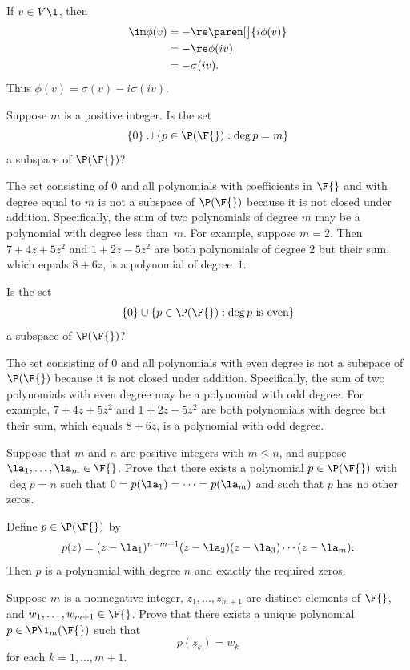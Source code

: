 \begin{Solution}
If $v \in V\1$, then
\begin{align*}
\im \phi(v) &= - \re \paren[\big]{i\phi(v)}\\
&= - \re \phi(iv) \\
&= - \sigma(iv).
\end{align*}
Thus $\phi(v) = \sigma(v) - i \sigma(iv)$.
\end{Solution}

\exercise
Suppose $m$ is a positive integer.  Is the set
\[
\{0\} \cup \{p \in \P(\F{}): \deg p = m\}
\]
a subspace of $\P(\F{})$?

\begin{Solution}
The set consisting of $0$ and all
polynomials with coefficients in $\F{}$ and with degree equal to $m$ is not a
subspace of $\P(\F{})$ because it is not closed under addition.  Specifically,
the sum of two polynomials of degree $m$ may be a polynomial with degree less
than~$m$.  For example, suppose $m = 2$.  Then $7 + 4z + 5z^2$ and
$1 + 2z - 5z^2$ are both polynomials of degree $2$ but their sum, which equals
$8 + 6z$, is a polynomial of degree~$1$.
\end{Solution}

\exercise
Is the set
\[
\{0\} \cup \{p \in \P(\F{}): \deg p \text{ is even}\}
\]
a subspace of $\P(\F{})$?

\begin{Solution}
The set consisting of $0$ and all polynomials with even degree is not a subspace of $\P(\F{})$ because it is not closed under addition.  Specifically, the sum of two polynomials with even degree may be a polynomial with odd degree.  For example, $7 + 4z + 5z^2$ and
$1 + 2z - 5z^2$ are both polynomials with degree but their sum, which equals $8 + 6z$, is a polynomial with odd degree.
\end{Solution}

\exercise
Suppose that $m$ and $n$ are positive integers with $m \le n$, and suppose $\la_1, \dots, \la_m \in \F{}$. Prove that there exists a polynomial $p \in \P(\F{})$ with $\deg p = n$ such that $0 = p(\la_1) = \dots = p(\la_m)$ and such that $p$ has no other zeros.

\begin{Solution}
Define $p \in \P(\F{})$ by
\[
p(z) = (z-\la_1)^{n-m+1} (z-\la_2) (z-\la_3) \dotsm (z-\la_m).
\]
Then $p$ is a polynomial with degree $n$ and exactly the required zeros.
\end{Solution}

\exercise
Suppose $m$ is a nonnegative integer, $z_1, \dots, z_{m+1}$ are distinct elements of $\F{}$, and
$w_1, \dots, w_{m+1} \in \F{}$.  Prove that there exists a unique polynomial
$p \in \P\1_m(\F{})$ such that \label{PolyInterpolation}
\[
p(z_k) = w_k
\]
for each $k = 1, \dots, m + 1$.

